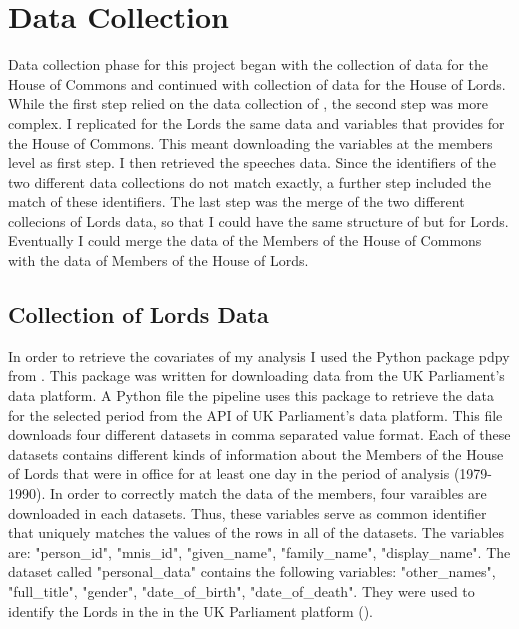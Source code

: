 \newpage
\section{Data Collection}
Data collection phase for this project began with the collection of data for the House of Commons and continued with collection of data for the House of Lords. While the first step relied on the data collection of \textcite{blumenauHouseCommonsParliamentary2021}, the second step was more complex. I replicated for the Lords the same data and variables that \textcite{blumenauHouseCommonsParliamentary2021} provides for the House of Commons. This meant downloading the variables at the members level as first step. I then retrieved the speeches data. Since the identifiers of the two different data collections do not match exactly, a further step included the match of these identifiers. The last step was the merge of the two different collecions of Lords data, so that I could have the same structure of \textcite{blumenauHouseCommonsParliamentary2021} but for Lords. Eventually I could merge the data of the Members of the House of Commons with the data of Members of the House of Lords.

\subsection{Collection of Lords Data}
In order to retrieve the covariates of my analysis I used the Python package pdpy from \textcite{HouseofcommonslibraryPdpyPython}. This package was written for downloading data from the UK Parliament's data platform. A Python file the pipeline uses this package to retrieve the data for the selected period from the API of UK Parliament's data platform. This file downloads four different datasets in comma separated value format. Each of these datasets contains different kinds of information about the Members of the House of Lords that were in office for at least one day in the period of analysis (1979-1990). In order to correctly match the data of the members, four varaibles are downloaded in each datasets. Thus, these variables serve as common identifier that uniquely matches the values of the rows in all of the datasets. The variables are: "person\_id", "mnis\_id", "given\_name", "family\_name", "display\_name".
The dataset called "personal\_data" contains the following variables: "other\_names", "full\_title", "gender", "date\_of\_birth", "date\_of\_death". They were used to identify the Lords in the in the UK Parliament platform (\textcite{MPsLordsUK}).

